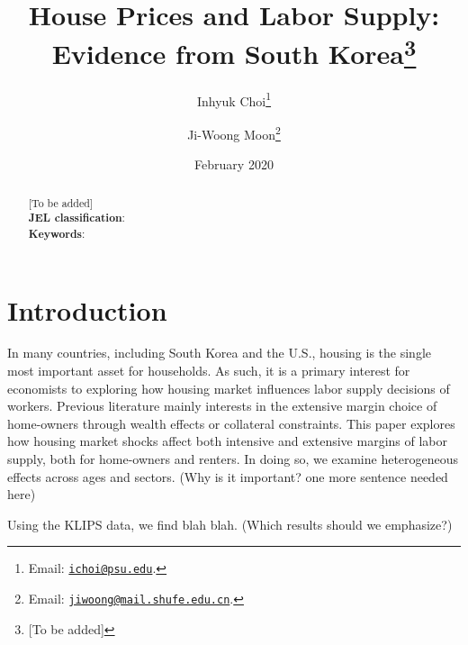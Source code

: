 \documentclass[10pt]{article}
\title{House Prices and Labor Supply: Evidence from South Korea\thanks{[To be added]}}
\author{
    Inhyuk Choi\thanks{Email: \texttt{\href{mailto:ichoi@psu.edu}{ichoi@psu.edu}}.}
    \and
    Ji-Woong Moon\thanks{Email: \texttt{\href{mailto:jiwoong@mail.shufe.edu.cn}{jiwoong@mail.shufe.edu.cn}}.}
    }
\date{February 2020}
\theoremstyle{definition}
\theoremstyle{remark}
\begin{document}
\maketitle

\begin{abstract}
    [To be added] \\
    \textbf{JEL classification}: \\
    \textbf{Keywords}: 
\end{abstract}

\newpage

\section{Introduction}\label{sec:intro}
In many countries, including South Korea and the U.S., housing is the single most important asset for households. As such, it is a primary interest for economists to exploring how housing market influences labor supply decisions of workers. Previous literature mainly interests in the extensive margin choice of home-owners through wealth effects or collateral constraints. This paper explores how housing market shocks affect both intensive and extensive margins of labor supply, both for home-owners and renters. In doing so, we examine heterogeneous effects across ages and sectors. (Why is it important? one more sentence needed here)

Using the KLIPS data, we find blah blah. (Which results should we emphasize?)
\end{document}
